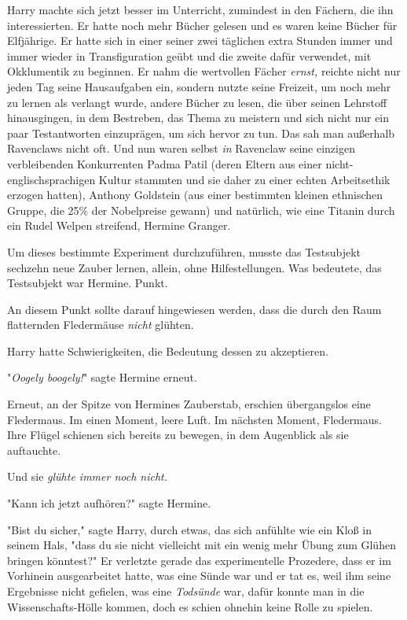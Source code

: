 {Harry machte sich jetzt besser im Unterricht, zumindest in den Fächern, die ihn interessierten. Er hatte noch mehr Bücher gelesen und es waren keine Bücher für Elfjährige. Er hatte sich in einer seiner zwei täglichen extra Stunden immer und immer wieder in Transfiguration geübt und die zweite dafür verwendet, mit Okklumentik zu beginnen. Er nahm die wertvollen Fächer \emph{ernst,} reichte nicht nur jeden Tag seine Hausaufgaben ein, sondern nutzte seine Freizeit, um noch mehr zu lernen als verlangt wurde, andere Bücher zu lesen, die über seinen Lehrstoff hinausgingen, in dem Bestreben, das Thema zu meistern und sich nicht nur ein paar Testantworten einzuprägen, um sich hervor zu tun. Das sah man außerhalb Ravenclaws nicht oft. Und nun waren selbst \emph{in} Ravenclaw seine einzigen verbleibenden Konkurrenten Padma Patil (deren Eltern aus einer nicht-englischsprachigen Kultur stammten und sie daher zu einer echten Arbeitsethik erzogen hatten), Anthony Goldstein (aus einer bestimmten kleinen ethnischen Gruppe, die 25\% der Nobelpreise gewann) und natürlich, wie eine Titanin durch ein Rudel Welpen streifend, Hermine Granger.

Um dieses bestimmte Experiment durchzuführen, musste das Testsubjekt sechzehn neue Zauber lernen, allein, ohne Hilfestellungen. Was bedeutete, das Testsubjekt war Hermine. Punkt.

An diesem Punkt sollte darauf hingewiesen werden, dass die durch den Raum flatternden Fledermäuse \emph{nicht} glühten.

Harry hatte Schwierigkeiten, die Bedeutung dessen zu akzeptieren.

"\emph{Oogely boogely!}" sagte Hermine erneut.

Erneut, an der Spitze von Hermines Zauberstab, erschien übergangslos eine Fledermaus. Im einen Moment, leere Luft. Im nächsten Moment, Fledermaus. Ihre Flügel schienen sich bereits zu bewegen, in dem Augenblick als sie auftauchte.

Und sie \emph{glühte immer noch nicht.}

"Kann ich jetzt aufhören?" sagte Hermine.

"Bist du sicher," sagte Harry, durch etwas, das sich anfühlte wie ein Kloß in seinem Hals, "dass du sie nicht vielleicht mit ein wenig mehr Übung zum Glühen bringen könntest?" Er verletzte gerade das experimentelle Prozedere, dass er im Vorhinein ausgearbeitet hatte, was eine Sünde war und er tat es, weil ihm seine Ergebnisse nicht gefielen, was eine \emph{Todsünde} war, dafür konnte man in die Wissenschafts-Hölle kommen, doch es schien ohnehin keine Rolle zu spielen.

}
